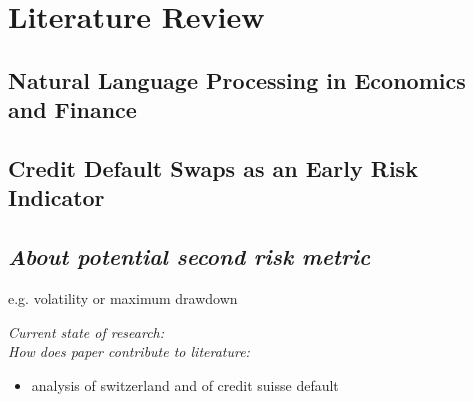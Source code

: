 \chapter{Literature Review}\label{sec3}
\thispagestyle{empty}

\section{Natural Language Processing in Economics and Finance}

\section{Credit Default Swaps as an Early Risk Indicator}

\section{\textit{About potential second risk metric}}

e.g. volatility or maximum drawdown

\textit{Current state of research:}\\

\noindent
\textit{How does paper contribute to literature:}

\begin{itemize}
	\item analysis of switzerland and of credit suisse default
\end{itemize}

\cleardoublepage
